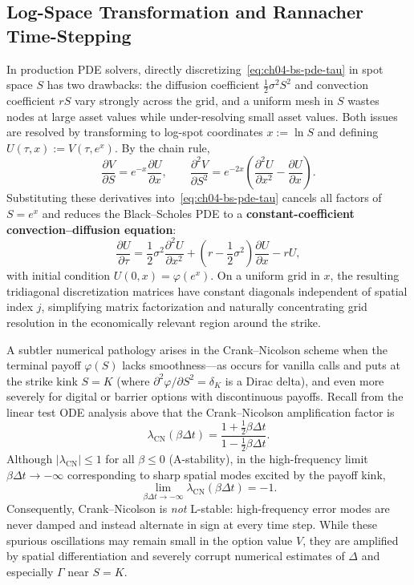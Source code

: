 \subsection{Log-Space Transformation and Rannacher Time-Stepping}
\label{sec:ch04-fd-refinements}
In production PDE solvers, directly discretizing~\eqref{eq:ch04-bs-pde-tau} in spot space $S$ has two drawbacks: the diffusion coefficient $\frac{1}{2}\sigma^2 S^2$ and convection coefficient $r S$ vary strongly across the grid, and a uniform mesh in $S$ wastes nodes at large asset values while under-resolving small asset values. Both issues are resolved by transforming to log-spot coordinates $x := \ln S$ and defining $U(\tau, x) := V(\tau, e^x)$. By the chain rule,
\[
    \frac{\partial V}{\partial S} = e^{-x}\frac{\partial U}{\partial x}, \qquad
    \frac{\partial^2 V}{\partial S^2} = e^{-2x}\left(\frac{\partial^2 U}{\partial x^2} - \frac{\partial U}{\partial x}\right).
\]
Substituting these derivatives into~\eqref{eq:ch04-bs-pde-tau} cancels all factors of $S = e^x$ and reduces the Black--Scholes PDE to a \textbf{constant-coefficient convection--diffusion equation}:
\begin{equation}
    \label{eq:ch04-bs-log-pde}
    \frac{\partial U}{\partial \tau}
    = \frac{1}{2}\sigma^2 \frac{\partial^2 U}{\partial x^2}
    + \left(r - \frac{1}{2}\sigma^2\right)\frac{\partial U}{\partial x}
    - r U,
\end{equation}
with initial condition $U(0, x) = \varphi(e^x)$. On a uniform grid in $x$, the resulting tridiagonal discretization matrices have constant diagonals independent of spatial index $j$, simplifying matrix factorization and naturally concentrating grid resolution in the economically relevant region around the strike.

A subtler numerical pathology arises in the Crank--Nicolson scheme when the terminal payoff $\varphi(S)$ lacks smoothness---as occurs for vanilla calls and puts at the strike kink $S = K$ (where $\partial^2 \varphi / \partial S^2 = \delta_K$ is a Dirac delta), and even more severely for digital or barrier options with discontinuous payoffs. Recall from the linear test ODE analysis above that the Crank--Nicolson amplification factor is
\[
    \lambda_{\mathrm{CN}}(\beta\Delta t) = \frac{1 + \frac{1}{2}\beta\Delta t}{1 - \frac{1}{2}\beta\Delta t}.
\]
Although $|\lambda_{\mathrm{CN}}| \le 1$ for all $\beta \le 0$ (A-stability), in the high-frequency limit $\beta\Delta t \to -\infty$ corresponding to sharp spatial modes excited by the payoff kink,
\[
    \lim_{\beta\Delta t \to -\infty} \lambda_{\mathrm{CN}}(\beta\Delta t) = -1.
\]
Consequently, Crank--Nicolson is \emph{not} L-stable: high-frequency error modes are never damped and instead alternate in sign at every time step. While these spurious oscillations may remain small in the option value $V$, they are amplified by spatial differentiation and severely corrupt numerical estimates of $\Delta$ and especially $\Gamma$ near $S = K$.

